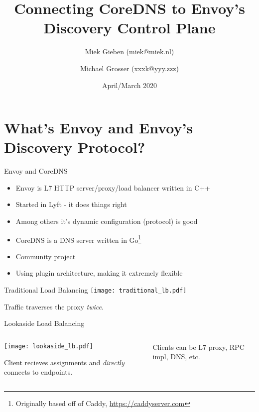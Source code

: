 \documentclass[aspectratio=169]{beamer}
\title{Connecting CoreDNS to Envoy's Discovery Control Plane}
\date{April/March 2020}
\author{Miek Gieben (miek@miek.nl) \and Michael Grosser (xxxk@yyy.zzz)}
\institute{Centre for protobuf Nerding}
\begin{document}
    \let\oldfootnotesize\footnotesize
    \renewcommand*{\footnotesize}{\oldfootnotesize\tiny}

    \maketitle

    \section{What's Envoy and Envoy's Discovery Protocol?}
    \begin{frame}{Envoy and CoreDNS}
        \begin{itemize}
            \item Envoy is L7 HTTP server/proxy/load balancer written in C++
            \item Started in Lyft - it does things right
            \item Among others it's dynamic configuration (protocol) is good
        \end{itemize}

        \begin{itemize}
            \item CoreDNS is a DNS server written in Go\footnote{Originally based off of Caddy, \url{https://caddyserver.com}}
            \item Community project
            \item Using plugin architecture, making it extremely flexible
        \end{itemize}
    \end{frame}

    \begin{frame}{Traditional Load Balancing}
        \texttt{[image: traditional\_lb.pdf]}

        Traffic traverses the proxy \emph{twice}.
    \end{frame}

    \begin{frame}{Lookaside Load Balancing}
        \begin{columns}
            \begin{column}{0.7\textwidth}
                \texttt{[image: lookaside\_lb.pdf]}

                Client recieves assignments and \emph{directly} connects to endpoints.
            \end{column}

            \begin{column}{0.3\textwidth}
                Clients can be L7 proxy, RPC impl, DNS, etc.
            \end{column}
        \end{columns}
    \end{frame}
\end{document}
